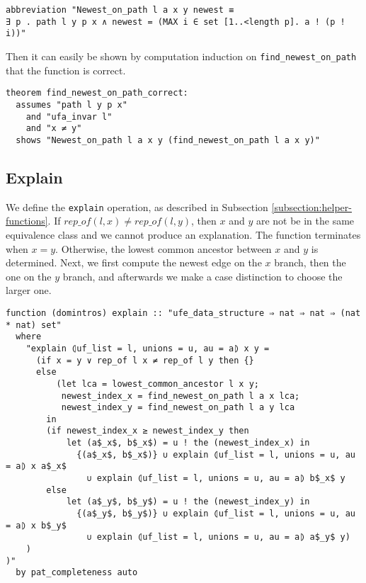 \begin{lstlisting}
abbreviation "Newest_on_path l a x y newest ≡
∃ p . path l y p x ∧ newest = (MAX i ∈ set [1..<length p]. a ! (p ! i))"
\end{lstlisting}

Then it can easily be shown by computation induction on \lstinline{find_newest_on_path} that the function is correct.

\begin{lstlisting}
theorem find_newest_on_path_correct:
  assumes "path l y p x"
    and "ufa_invar l"
    and "x ≠ y"
  shows "Newest_on_path l a x y (find_newest_on_path l a x y)"
\end{lstlisting}

\subsection{Explain}

We define the \lstinline|explain| operation, as described in Subsection \ref{subsection:helper-functions}.
If $rep\_of(l, x) \neq rep\_of(l, y)$, then $x$ and $y$ are not be in the same equivalence class and we cannot produce an explanation.
The function terminates when $x = y$.
Otherwise, the lowest common ancestor between $x$ and $y$ is determined.
Next, we first compute the newest edge on the $x$ branch, then the one on the $y$ branch, and afterwards we make a case distinction to choose the larger one.

\begin{lstlisting}
function (domintros) explain :: "ufe_data_structure ⇒ nat ⇒ nat ⇒ (nat * nat) set"
  where
    "explain ⦇uf_list = l, unions = u, au = a⦈ x y =
      (if x = y ∨ rep_of l x ≠ rep_of l y then {}
      else
          (let lca = lowest_common_ancestor l x y;
           newest_index_x = find_newest_on_path l a x lca;
           newest_index_y = find_newest_on_path l a y lca
        in
        (if newest_index_x ≥ newest_index_y then
            let (a$_x$, b$_x$) = u ! the (newest_index_x) in
              {(a$_x$, b$_x$)} ∪ explain ⦇uf_list = l, unions = u, au = a⦈ x a$_x$
                ∪ explain ⦇uf_list = l, unions = u, au = a⦈ b$_x$ y
        else
            let (a$_y$, b$_y$) = u ! the (newest_index_y) in
              {(a$_y$, b$_y$)} ∪ explain ⦇uf_list = l, unions = u, au = a⦈ x b$_y$
                ∪ explain ⦇uf_list = l, unions = u, au = a⦈ a$_y$ y)
    )
)"
  by pat_completeness auto
\end{lstlisting}

